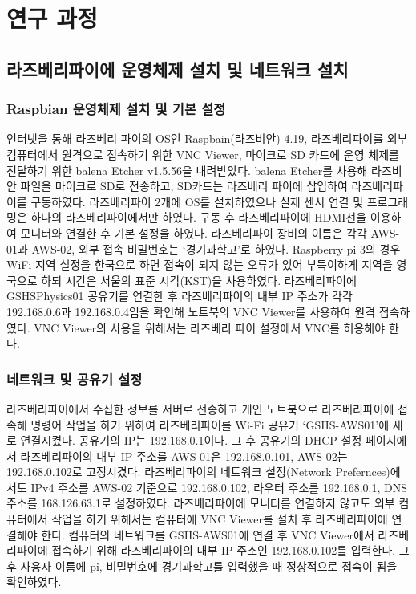 \section{연구 과정}

\subsection{라즈베리파이에 운영체제 설치 및 네트워크 설치}
\subsubsection{Raspbian 운영체제 설치 및 기본 설정}
인터넷을 통해 라즈베리 파이의 OS인 Raspbain(라즈비안) 4.19, 라즈베리파이를 외부 컴퓨터에서 원격으로 접속하기 위한 VNC Viewer, 마이크로 SD 카드에 운영 체제를 전달하기 위한 balena Etcher v1.5.56을 내려받았다. balena Etcher를 사용해 라즈비안 파일을 마이크로 SD로 전송하고, SD카드는 라즈베리 파이에 삽입하여 라즈베리파이를 구동하였다. 라즈베리파이 2개에 OS를 설치하였으나 실제 센서 연결 및 프로그래밍은 하나의 라즈베리파이에서만 하였다.
구동 후 라즈베리파이에 HDMI선을 이용하여 모니터와 연결한 후 기본 설정을 하였다. 라즈베리파이 장비의 이름은 각각 AWS-01과 AWS-02, 외부 접속 비밀번호는 ‘경기과학고’로 하였다. Raspberry pi 3의 경우 WiFi 지역 설정을 한국으로 하면 접속이 되지 않는 오류가 있어 부득이하게 지역을 영국으로 하되 시간은 서울의 표준 시각(KST)을 사용하였다. 라즈베리파이에 GSHSPhysics01 공유기를 연결한 후 라즈베리파이의 내부 IP 주소가 각각 192.168.0.6과 192.168.0.4임을 확인해 노트북의 VNC Viewer를 사용하여 원격 접속하였다. VNC Viewer의 사용을 위해서는 라즈베리 파이 설정에서 VNC를 허용해야 한다.
\subsubsection{네트워크 및 공유기 설정}
라즈베리파이에서 수집한 정보를 서버로 전송하고 개인 노트북으로 라즈베리파이에 접속해 명령어 작업을 하기 위하여 라즈베리파이를 Wi-Fi 공유기 ‘GSHS-AWS01’에 새로 연결시켰다. 공유기의 IP는 192.168.0.1이다. 그 후 공유기의 DHCP 설정 페이지에서 라즈베리파이의 내부 IP 주소를 AWS-01은 192.168.0.101, AWS-02는 192.168.0.102로 고정시켰다. 라즈베리파이의 네트워크 설정(Network Prefernces)에서도 IPv4 주소를 AWS-02 기준으로 192.168.0.102, 라우터 주소를 192.168.0.1, DNS 주소를 168.126.63.1로 설정하였다. 라즈베리파이에 모니터를 연결하지 않고도 외부 컴퓨터에서 작업을 하기 위해서는 컴퓨터에 VNC Viewer를 설치 후 라즈베리파이에 연결해야 한다. 컴퓨터의 네트워크를 GSHS-AWS01에 연결 후 VNC Viewer에서 라즈베리파이에 접속하기 위해 라즈베리파이의 내부 IP 주소인 192.168.0.102를 입력한다. 그 후 사용자 이름에 pi, 비밀번호에 경기과학고를 입력했을 때 정상적으로 접속이 됨을 확인하였다.

